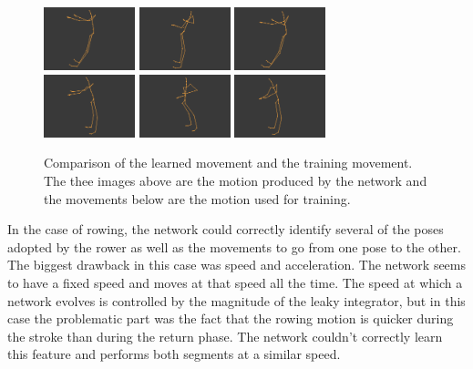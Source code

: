 \documentclass[letterpaper,9pt]{article}
\begin{document}
\begin{figure}[h!]
  \centering
  \includegraphics[width=100px]{Extra/out_row_1.png}
  \includegraphics[width=100px]{Extra/out_row_2.png}
  \includegraphics[width=100px]{Extra/out_row_3.png}\\
  \includegraphics[width=100px]{Extra/teach_row_1.png}
  \includegraphics[width=100px]{Extra/teach_row_2.png}
  \includegraphics[width=100px]{Extra/teach_row_3.png}
    \caption[Rowing]{Comparison of the learned movement and the training movement. The thee images above are the motion produced by the network and the movements below are the motion used for training.}
\end{figure}

In the case of rowing, the network could correctly identify several of the poses adopted by the rower as well as the movements to go from one pose to the other. The biggest drawback in this case was speed and acceleration. The network seems to have a fixed speed and moves at that speed all the time. The speed at which a network evolves is controlled by the magnitude of the leaky integrator, but in this case the problematic part was the fact that the rowing motion is quicker during the stroke than during the return phase. The network couldn't correctly learn this feature and performs both segments at a similar speed.
\end{document}
